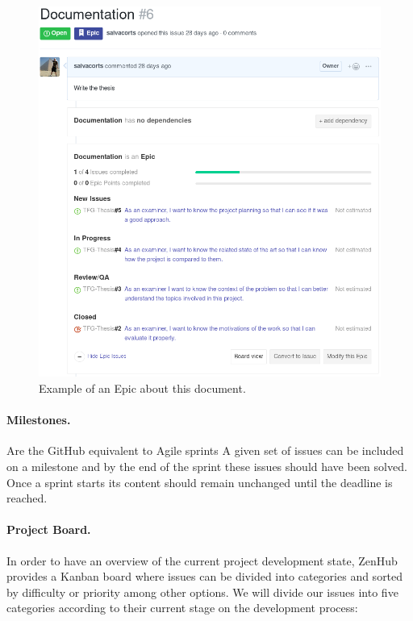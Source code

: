 \begin{figure}[h!]
		\centering
    	\includegraphics[width=\linewidth]{assets/images/Epic.png}
    	\caption{Example of an Epic about this document.}
    	\label{fig:epic}
\end{figure}

\paragraph*{Milestones.} Are the GitHub equivalent to Agile sprints A given set of issues can be included on a milestone and by the end of the sprint these issues should have been solved. Once a sprint starts its content should remain unchanged until the deadline is reached.

\paragraph*{Project Board.} In order to have an overview of the current project development state, ZenHub provides a Kanban board \cite{kanban} where issues can be divided into categories and sorted by difficulty or priority among other options. We will divide our issues into five categories according to their current stage on the development process:

